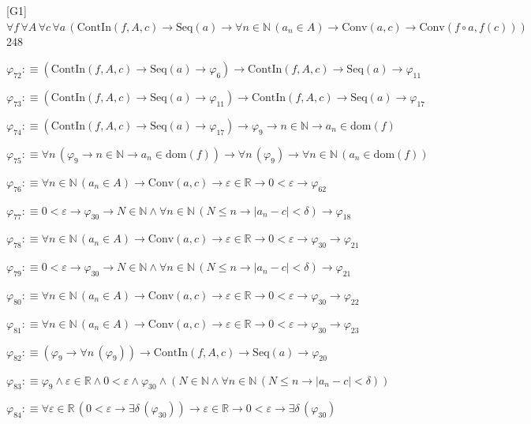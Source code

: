 \begin{fullproof}{[G1]}{$\forall f\,\forall A\,\forall c\,\forall a\,(\mathrm{ContIn}(f,A,c) \to \mathrm{Seq}(a) \to \forall n \in \mathbb{N}\,(a_{n} \in A) \to \mathrm{Conv}(a,c) \to \mathrm{Conv}(f \circ a,f(c)))$}{248}
\begin{abbrevlist}
\item $\varphi_{72} :\equiv (\mathrm{ContIn}(f,A,c) \to \mathrm{Seq}(a) \to \varphi_{6}) \to \mathrm{ContIn}(f,A,c) \to \mathrm{Seq}(a) \to \varphi_{11}$
\item $\varphi_{73} :\equiv (\mathrm{ContIn}(f,A,c) \to \mathrm{Seq}(a) \to \varphi_{11}) \to \mathrm{ContIn}(f,A,c) \to \mathrm{Seq}(a) \to \varphi_{17}$
\item $\varphi_{74} :\equiv (\mathrm{ContIn}(f,A,c) \to \mathrm{Seq}(a) \to \varphi_{17}) \to \varphi_{9} \to n \in \mathbb{N} \to a_{n} \in \mathrm{dom}(f)$
\item $\varphi_{75} :\equiv \forall n\,(\varphi_{9} \to n \in \mathbb{N} \to a_{n} \in \mathrm{dom}(f)) \to \forall n\,(\varphi_{9}) \to \forall n \in \mathbb{N}\,(a_{n} \in \mathrm{dom}(f))$
\item $\varphi_{76} :\equiv \forall n \in \mathbb{N}\,(a_{n} \in A) \to \mathrm{Conv}(a,c) \to \varepsilon \in \mathbb{R} \to 0 < \varepsilon \to \varphi_{62}$
\item $\varphi_{77} :\equiv 0 < \varepsilon \to \varphi_{30} \to N \in \mathbb{N} \land \forall n \in \mathbb{N}\,(N \leq n \to \lvert a_{n} - c \rvert < \delta) \to \varphi_{18}$
\item $\varphi_{78} :\equiv \forall n \in \mathbb{N}\,(a_{n} \in A) \to \mathrm{Conv}(a,c) \to \varepsilon \in \mathbb{R} \to 0 < \varepsilon \to \varphi_{30} \to \varphi_{21}$
\item $\varphi_{79} :\equiv 0 < \varepsilon \to \varphi_{30} \to N \in \mathbb{N} \land \forall n \in \mathbb{N}\,(N \leq n \to \lvert a_{n} - c \rvert < \delta) \to \varphi_{21}$
\item $\varphi_{80} :\equiv \forall n \in \mathbb{N}\,(a_{n} \in A) \to \mathrm{Conv}(a,c) \to \varepsilon \in \mathbb{R} \to 0 < \varepsilon \to \varphi_{30} \to \varphi_{22}$
\item $\varphi_{81} :\equiv \forall n \in \mathbb{N}\,(a_{n} \in A) \to \mathrm{Conv}(a,c) \to \varepsilon \in \mathbb{R} \to 0 < \varepsilon \to \varphi_{30} \to \varphi_{23}$
\item $\varphi_{82} :\equiv (\varphi_{9} \to \forall n\,(\varphi_{9})) \to \mathrm{ContIn}(f,A,c) \to \mathrm{Seq}(a) \to \varphi_{20}$
\item $\varphi_{83} :\equiv \varphi_{9} \land \varepsilon \in \mathbb{R} \land 0 < \varepsilon \land \varphi_{30} \land (N \in \mathbb{N} \land \forall n \in \mathbb{N}\,(N \leq n \to \lvert a_{n} - c \rvert < \delta))$
\item $\varphi_{84} :\equiv \forall \varepsilon \in \mathbb{R}\,(0 < \varepsilon \to \exists \delta\,(\varphi_{30})) \to \varepsilon \in \mathbb{R} \to 0 < \varepsilon \to \exists \delta\,(\varphi_{30})$

\end{abbrevlist}
\end{fullproof}

